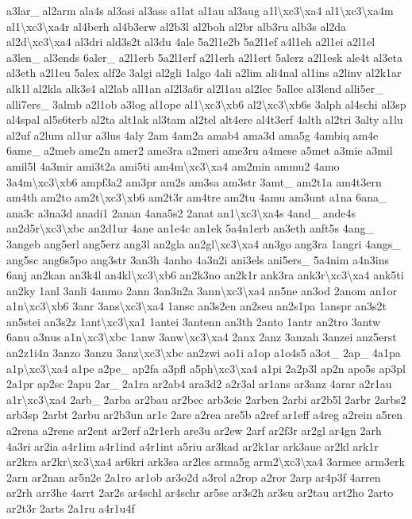 {a3lar\-\_\- al2arm ala4s al3asi al3ass a1lat al1au al3aug a1l\textbackslash{}xc3\textbackslash{}xa4 al1\textbackslash{}xc3\textbackslash{}xa4m al1\textbackslash{}xc3\textbackslash{}xa4r al4berh al4b3erw al2b3l al2boh al2br alb3ru alb3s al2da al2d\textbackslash{}xc3\textbackslash{}xa4 al3dri ald3s2t al3du 4ale 5a2l1e2b 5a2l1ef a4l1eh a2l1ei a2l1el a3len\-\_\- al3ends 6aler\-\_\- a2l1erb 5a2l1erf a2l1erh a2l1ert 5alerz a2l1esk ale4t al3eta al3eth a2l1eu 5alex alf2e 3algi al2gli 1algo 4ali a2lim ali4nal al1ins a2linv al2k1ar alk1l al2kla alk3s4 al2lab all1an al2l3a6r al2l1au al2lec 5allee al3lend alli5er\-\_\- alli7ers\-\_\- 3almb a2l1ob a3log al1ope al1\textbackslash{}xc3\textbackslash{}xb6 al2\textbackslash{}xc3\textbackslash{}xb6s 3alph al4schi al3sp al4spal al5s6terb al2ta alt1ak al3tam al2tel alt4ere al4t3erf 4alth al2tri 3alty a1lu al2uf a2lum al1ur a3lus 4aly 2am 4am2a amab4 ama3d ama5g 4ambiq am4e 6ame\-\_\- a2meb ame2n amer2 ame3ra a2meri ame3ru a4mese a5met a3mie a3mil amil5l 4a3mir ami3t2a ami5ti am4m\textbackslash{}xc3\textbackslash{}xa4 am2min ammu2 4amo 3a4m\textbackslash{}xc3\textbackslash{}xb6 ampf3a2 am3pr am2s am3sa am3str 3amt\-\_\- am2t1a am4t3ern am4th am2to am2t\textbackslash{}xc3\textbackslash{}xb6 am2t3r am4tre am2tu 4amu am3unt a1na 6ana\-\_\- ana3c a3na3d anadi1 2anan 4ana5s2 2anat an1\textbackslash{}xc3\textbackslash{}xa4s 4and\-\_\- ande4s an2d5r\textbackslash{}xc3\textbackslash{}xbc an2d1ur 4ane an1e4c an1ek 5a4n1erb an3eth anft5s 4ang\-\_\- 3angeb ang5erl ang5erz ang3l an2gla an2gl\textbackslash{}xc3\textbackslash{}xa4 an3go ang3ra 1angri 4angs\-\_\- ang5sc ang6s5po ang3str 3an3h 4anho 4a3n2i ani3els ani5ers\-\_\- 5a4nim a4n3ins 6anj an2kan an3k4l an4kl\textbackslash{}xc3\textbackslash{}xb6 an2k3no an2k1r ank3ra ank3r\textbackslash{}xc3\textbackslash{}xa4 ank5ti an2ky 1anl 3anli 4anmo 2ann 3an3n2a 3ann\textbackslash{}xc3\textbackslash{}xa4 an5ne an3od 2anom an1or a1n\textbackslash{}xc3\textbackslash{}xb6 3anr 3ans\textbackslash{}xc3\textbackslash{}xa4 1ansc an3s2en an2seu an2s1pa 1anspr an3s2t an5stei an3s2z 1ant\textbackslash{}xc3\textbackslash{}xa1 1antei 3antenn an3th 2anto 1antr an2tro 3antw 6anu a3nus a1n\textbackslash{}xc3\textbackslash{}xbc 1anw 3anw\textbackslash{}xc3\textbackslash{}xa4 2anx 2anz 3anzah 3anzei anz5erst an2z1i4n 3anzo 3anzu 3anz\textbackslash{}xc3\textbackslash{}xbc an2zwi ao1i a1op a1o4s5 a3ot\-\_\- 2ap\-\_\- 4a1pa a1p\textbackslash{}xc3\textbackslash{}xa4 a1pe a2pe\-\_\- ap2fa a3pfl a5ph\textbackslash{}xc3\textbackslash{}xa4 a1pi 2a2p3l ap2n apo5s ap3pl 2a1pr ap2sc 2apu 2ar\-\_\- 2a1ra ar2ab4 ara3d2 a2r3al ar1ans ar3anz 4arar a2r1au a1r\textbackslash{}xc3\textbackslash{}xa4 2arb\-\_\- 2arba ar2bau ar2bec arb3eie 2arben 2arbi ar2b5l 2arbr 2arbs2 arb3sp 2arbt 2arbu ar2b3un ar1c 2are a2rea are5b a2ref ar1eff a4reg a2rein a5ren a2rena a2rene ar2ent ar2erf a2r1erh are3u ar2ew 2arf ar2f3r ar2gl ar4gn 2arh 4a3ri ar2ia a4r1im a4r1ind a4r1int a5riu ar3kad ar2k1ar ark3aue ar2kl ark1r ar2kra ar2kr\textbackslash{}xc3\textbackslash{}xa4 ar6kri ark3sa ar2les arma5g arm2\textbackslash{}xc3\textbackslash{}xa4 3armee arm3erk 2arn ar2nan ar5n2e 2a1ro ar1ob ar3o2d a3rol a2rop a2ror 2arp ar4p3f 4arren ar2rh arr3he 4arrt 2ar2s ar4schl ar4schr ar5se ar3s2h ar3su ar2tau art2ho 2arto ar2t3r 2arts 2a1ru a4r1u4f }
